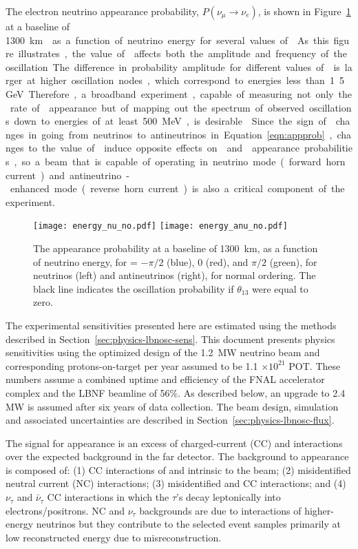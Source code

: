 The electron neutrino appearance probability, $P(\nu_\mu \rightarrow \nu_e)$, 
is shown in 
Figure~\ref{fig:oscprob} at a baseline of \SI{1300}\km{} as a function of neutrino 
energy for several values of \deltacp. As this figure illustrates, the value 
of \deltacp affects both the amplitude and frequency of
the oscillation. The difference in probability amplitude
for different values of \deltacp is larger at higher oscillation nodes, which 
correspond to energies less than 1.5~GeV. Therefore, a broadband experiment, 
capable of measuring not only the rate of \nue appearance but of mapping out the 
spectrum of observed oscillations down to energies of at least 500~MeV, 
is desirable~\cite{Diwan:2003bp}. Since the sign of  \deltacp changes in going from neutrinos to antineutrinos in Equation~\ref{eqn:appprob},
changes to the value of \deltacp induce opposite effects on \nue and
\anue appearance probabilities, so a beam that is capable of operating in
neutrino mode (forward horn current) and antineutrino-enhanced mode (reverse horn current)
is also a critical component of the experiment.



\begin{figure}
  \centering
\texttt{[image: energy\_nu\_no.pdf]}
\texttt{[image: energy\_anu\_no.pdf]}
  \caption{The appearance probability at a baseline of 1300~km,
  as a function of neutrino energy, for \deltacp = $-\pi/2$ (blue), 
  0 (red), and $\pi/2$ (green), for neutrinos (left) and antineutrinos
  (right), for normal ordering. The black line indicates the oscillation
  probability if $\theta_{13}$ were equal to zero.}
  \label{fig:oscprob}
\end{figure}

The experimental sensitivities presented here are estimated using the methods described in Section~\ref{sec:physics-lbnosc-sens}. This document presents physics sensitivities using the optimized design of the 1.2~MW neutrino beam and corresponding protons-on-target per year assumed to be 1.1 $\times 10^{21}$ POT.  These numbers assume a combined uptime and efficiency of the FNAL accelerator complex and the LBNF beamline of 56\%.  As described below, an upgrade to 2.4 MW is assumed after six years of data collection. The beam design, simulation and associated uncertainties are described in Section~\ref{sec:physics-lbnosc-flux}. 

The signal for \nue appearance is an excess of charged-current (CC) \nue and \anue interactions over the expected background in the far detector.  The background to \nue appearance is composed of: (1) CC interactions of \nue and \anue intrinsic to the beam; (2) misidentified neutral current (NC) interactions;  (3) misidentified \numu and \anumu CC interactions; and (4) $\nu_\tau$ and $\bar{\nu}_\tau$ CC interactions in which the $\tau$'s decay leptonically into electrons/positrons. NC and $\nu_\tau$ backgrounds are due to interactions of higher-energy
neutrinos but they contribute to the selected event samples primarily at low reconstructed energy due to misreconstruction.

